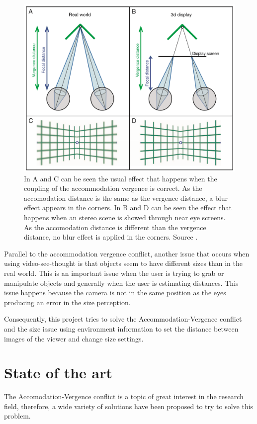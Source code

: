 \documentclass[10pt,a4paper,twocolumn,twoside]{article}
\begin{document}
	\begin{figure}
		\centering
		\includegraphics[width=1\linewidth]{img/vergencia.png}
		\caption{ In A and C can be seen the usual effect that happens when the coupling of the accommodation vergence is correct. As the accomodation distance is the same as the vergence distance, a blur effect appears in the corners. In B and D can be seen the effect that happens when an stereo scene is showed through near eye screens. As the accomodation distance is different than the vergence distance, no blur effect is applied in the corners. Source \cite{vergenceDisconfort}.}
		\label{fig:vergence}
	\end{figure}
	
	Parallel to the accommodation vergence conflict, another issue that occurs when using video-see-thought is that objects seem to have different sizes than in the real world. This is an important issue when the user is trying to grab or manipulate objects and generally when the user is estimating distances. This issue happens because the camera is not in the same position as the eyes producing an error in the size perception.
	
	Consequently, this project tries to solve the Accommodation-Vergence conflict and the size issue using environment information to set the distance between images of the viewer and change size settings.
	
		
	\section{State of the art}
	\label{sec:art}
	The Accomodation-Vergence conflict is a topic of great interest in the research field, therefore, a wide variety of  solutions have been proposed to try to solve this problem. 
	
\end{document}

